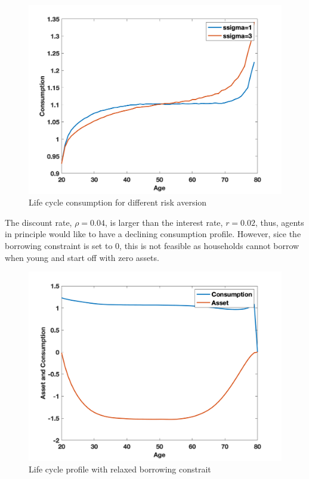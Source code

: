 \documentclass[letterpaper,12pt]{article}
\begin{document}
\begin{figure}
\includegraphics[scale=0.45]{Figures/Part1_PE/sim_risk}
\caption{Life cycle consumption for different risk aversion}
\end{figure}

The discount rate, $\rho = 0.04$, is larger than the interest rate, $r = 0.02$, thus, agents in principle would like to have a declining consumption profile. However, sice the borrowing constraint is set to $0$, this is not feasible as households cannot borrow when young and start off with zero assets. \\

\begin{figure}
\includegraphics[scale=0.45]{Figures/Part1_PE/sim_borrowing}
\caption{Life cycle profile with relaxed borrowing constrait}
\end{figure}
\end{document}
